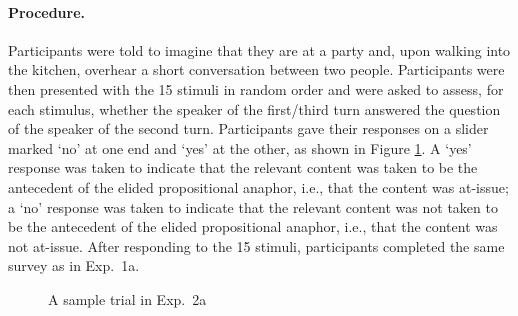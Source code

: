 \documentclass[11pt,fleqn]{article}
\newcommand{\6}{\mbox{$[\hspace*{-.6mm}[$}}
\newcommand{\9}{\mbox{$]\hspace*{-.6mm}]$}}
\begin{document}
\paragraph{Procedure.} Participants were told to imagine that they are at a party and, upon walking into the kitchen, overhear a short conversation between two people. Participants were then presented with the 15 stimuli in random order and were asked to assess, for each stimulus, whether the speaker of the first/third turn answered the question of the speaker of the second turn. Participants gave their responses on a slider marked `no' at one end and `yes' at the other, as shown in Figure \ref{f-trial-exp2a}. A `yes' response was taken to indicate that the relevant content was taken to be the antecedent of the elided propositional anaphor, i.e., that the content was at-issue; a `no' response was taken to indicate that the relevant content was not taken to be the antecedent of the elided propositional anaphor, i.e., that the content was not at-issue.
After responding to the 15 stimuli, participants completed the same survey as in Exp.~1a.


\begin{figure}[!h]
\begin{center}
\end{center}
\caption{A sample trial in Exp.~2a}
\label{f-trial-exp2a}
\end{figure}
\end{document}
